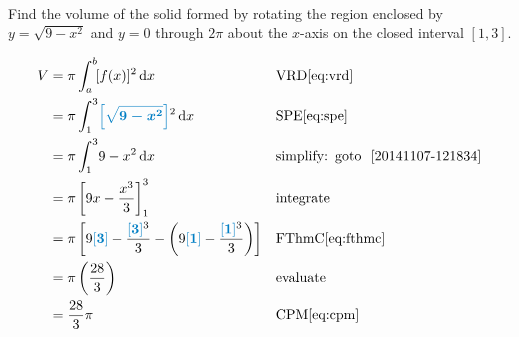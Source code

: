 \begin{example}[id:20141106-114907] \label{20141106-114907}  \hfill \\
	
Find the volume of the solid formed by rotating the region enclosed by $y=\sqrt{9-x^2}$ and $y=0$ through $2\pi$ about the $x$-axis on the closed interval $[1, 3]$.

\soln

\solnsteps
\begin{align*}
V & = \pi \displaystyle \int_{a}^{b} \! [f(x)]^2 \, \mathrm{d} x &&\text{VRD}\eqref{eq:vrd} \\
  & = \pi \displaystyle \int_{1}^{3} \! \farg{\sqrt{9-x^2}}^2 \, \mathrm{d} x && \text{SPE} \eqref{eq:spe} \\
  & = \pi \displaystyle \int_{1}^{3} \! 9-x^2 \, \mathrm{d} x && \text{simplify:} \text{\, goto \,} \, \ref{20141107-121834}\\
  & = \pi \left[9x-\dfrac{x^3}{3} \right]_{1}^{3}  &&\text{integrate} \\ %
  & = \pi \left[9\farg{3}-\dfrac{\farg{3}^3}{3} - \left(9\farg{1}-\dfrac{\farg{1}^3}{3} \right) \right] && \text{FThmC} \eqref{eq:fthmc} \\
  & = \pi \left(\dfrac{28}{3} \right)  &&\text{evaluate} \\
  & = \dfrac{28}{3}\pi && \text{CPM} \eqref{eq:cpm}  
\end{align*}


\end{example}

